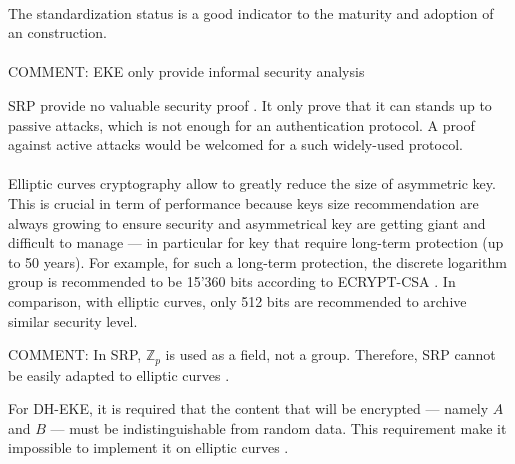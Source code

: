 \documentclass[../report.tex]{subfiles}
\begin{document}
\paragraph{}
The standardization status is a good indicator to the maturity and adoption of an construction.

\paragraph{}
COMMENT: EKE only provide informal security analysis \cite{EKE_Informal_Security_Analysis}

SRP provide no valuable security proof \cite{CAA, SRP_Green_blog}. It only prove that it can stands up to passive attacks, which is not enough for an authentication protocol. A proof against active attacks would be welcomed for a such widely-used protocol.

\paragraph{} \label{sec:ecc_comparison}
Elliptic curves cryptography allow to greatly reduce the size of asymmetric key.
This is crucial in term of performance because keys size recommendation are always growing to ensure security and asymmetrical key are getting giant and difficult to manage --- in particular for key that require long-term protection (up to 50 years). For example, for such a long-term protection, the discrete logarithm group is recommended to be 15'360 bits according to ECRYPT-CSA \cite{ECRYPT_Keylength}.
In comparison, with elliptic curves, only 512 bits are recommended to archive similar security level.

COMMENT: 
In SRP, $\mathbb{Z}_p$ is used as a field, not a group. Therefore, SRP cannot be easily adapted to elliptic curves \cite{CAA}. %


For DH-EKE, it is required that the content that will be encrypted --- namely $A$ and $B$ --- must be indistinguishable from random data. 
This requirement make it impossible to implement it on elliptic curves \cite{EKE_ECC}. %
\end{document}
